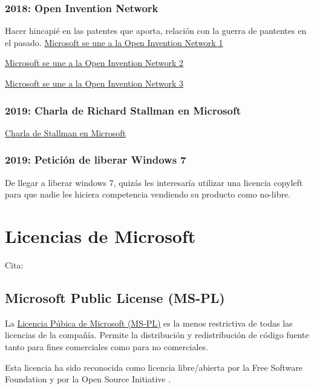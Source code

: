 \documentclass[10pt, titlepage]{article}
\begin{document}
\subsubsection{2018: Open Invention Network}
Hacer hincapié en las patentes que aporta, relación con la guerra de pantentes en el pasado.
\href{https://azure.microsoft.com/en-us/blog/microsoft-joins-open-invention-network-to-help-protect-linux-and-open-source/}{Microsoft se une a la Open Invention Network 1}

\href{https://www.zdnet.com/article/what-does-microsoft-joining-the-open-invention-network-mean-for-you/}{Microsoft se une a la Open Invention Network 2}

\href{https://www.muycomputerpro.com/2018/10/10/microsoft-se-une-a-open-invention-network}{Microsoft se une a la Open Invention Network 3}

\subsubsection{2019: Charla de Richard Stallman en Microsoft}
\href{https://stallman.org/articles/microsoft-talk.html}{Charla de Stallman en Microsoft}

\subsubsection{2019: Petición de liberar Windows 7}
De llegar a liberar windows 7, quizás les interesaría utilizar una licencia copyleft para que nadie les hiciera competencia vendiendo su producto como no-libre.



\section{Licencias de Microsoft}
Cita: \cite{desde_linux_2020}

\subsection{Microsoft Public License (MS-PL)}
La \href{https://opensource.org/licenses/MS-PL}{Licencia Púbica de Microsoft (MS-PL)} \cite{microsoft_public_license_mspl} es la menos restrictiva de todas las licencias de la compañía. Permite la distribución y redistribución de código fuente tanto para fines comerciales como para no comerciales.

Esta licencia ha sido reconocida como licencia libre/abierta por la Free Software Foundation y por la Open Source Initiative \cite{desde_linux_2020}.
\end{document}
